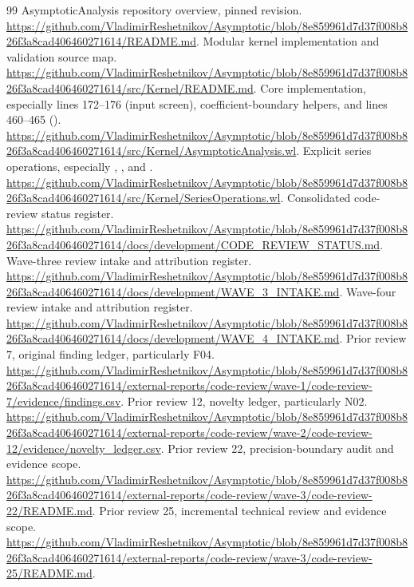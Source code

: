 \documentclass[11pt]{article}
\newcommand{\code}[1]{\texttt{\detokenize{#1}}}
\theoremstyle{remark}\newtheorem{remark}[theorem]{Remark}
\begin{document}
\begin{thebibliography}{99}\small
{} AsymptoticAnalysis repository overview, pinned revision.
\url{https://github.com/VladimirReshetnikov/Asymptotic/blob/8e859961d7d37f008b826f3a8cad406460271614/README.md}.
 Modular kernel implementation and validation source map.
\url{https://github.com/VladimirReshetnikov/Asymptotic/blob/8e859961d7d37f008b826f3a8cad406460271614/src/Kernel/README.md}.
 Core implementation, especially lines 172--176 (input screen),
coefficient-boundary helpers, and lines 460--465 (\code{fwdAbs}).
\url{https://github.com/VladimirReshetnikov/Asymptotic/blob/8e859961d7d37f008b826f3a8cad406460271614/src/Kernel/AsymptoticAnalysis.wl}.
 Explicit series operations, especially \code{seriesMake},
\code{seriesJetApply}, and \code{SeriesObservable}.
\url{https://github.com/VladimirReshetnikov/Asymptotic/blob/8e859961d7d37f008b826f3a8cad406460271614/src/Kernel/SeriesOperations.wl}.
 Consolidated code-review status register.
\url{https://github.com/VladimirReshetnikov/Asymptotic/blob/8e859961d7d37f008b826f3a8cad406460271614/docs/development/CODE_REVIEW_STATUS.md}.
 Wave-three review intake and attribution register.
\url{https://github.com/VladimirReshetnikov/Asymptotic/blob/8e859961d7d37f008b826f3a8cad406460271614/docs/development/WAVE_3_INTAKE.md}.
 Wave-four review intake and attribution register.
\url{https://github.com/VladimirReshetnikov/Asymptotic/blob/8e859961d7d37f008b826f3a8cad406460271614/docs/development/WAVE_4_INTAKE.md}.
 Prior review 7, original finding ledger, particularly F04.
\url{https://github.com/VladimirReshetnikov/Asymptotic/blob/8e859961d7d37f008b826f3a8cad406460271614/external-reports/code-review/wave-1/code-review-7/evidence/findings.csv}.
 Prior review 12, novelty ledger, particularly N02.
\url{https://github.com/VladimirReshetnikov/Asymptotic/blob/8e859961d7d37f008b826f3a8cad406460271614/external-reports/code-review/wave-2/code-review-12/evidence/novelty_ledger.csv}.
 Prior review 22, precision-boundary audit and evidence scope.
\url{https://github.com/VladimirReshetnikov/Asymptotic/blob/8e859961d7d37f008b826f3a8cad406460271614/external-reports/code-review/wave-3/code-review-22/README.md}.
 Prior review 25, incremental technical review and evidence scope.
\url{https://github.com/VladimirReshetnikov/Asymptotic/blob/8e859961d7d37f008b826f3a8cad406460271614/external-reports/code-review/wave-3/code-review-25/README.md}.

\end{thebibliography}
\end{document}
